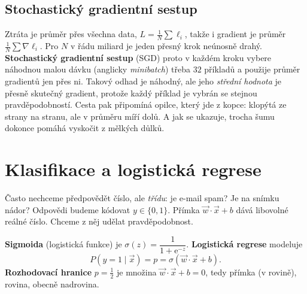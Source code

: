 \subsection{Stochastický gradientní sestup}

Ztráta je průměr přes všechna data, $L = \frac{1}{N}\sum\ell_i$, takže i gradient je průměr $\frac{1}{N}\sum\nabla\ell_i$. Pro $N$ v řádu miliard je jeden přesný krok neúnosně drahý. \textbf{Stochastický gradientní sestup} (SGD) proto v každém kroku vybere náhodnou malou dávku (anglicky \textit{minibatch}) třeba $32$ příkladů a použije průměr gradientů jen přes ni. Takový odhad je náhodný, ale jeho \textit{střední hodnota} je přesně skutečný gradient, protože každý příklad je vybrán se stejnou pravděpodobností. Cesta pak připomíná opilce, který jde z kopce: klopýtá ze strany na stranu, ale v průměru míří dolů. A jak se ukazuje, trocha šumu dokonce pomáhá vyskočit z mělkých důlků.

\section{Klasifikace a logistická regrese}

Často nechceme předpovědět číslo, ale \textit{třídu}: je e-mail spam? Je na snímku nádor? Odpovědi budeme kódovat $y\in\{0, 1\}$. Přímka $\vec{w}\cdot\vec{x} + b$ dává libovolné reálné číslo. Chceme z něj udělat pravděpodobnost.

\begin{definitionbox}
  \textbf{Sigmoida} (logistická funkce) je $\sigma(z) = \dfrac{1}{1 + \mathrm{e}^{-z}}$. \textbf{Logistická regrese} modeluje
  \begin{equation*}
    P(y = 1\mid\vec{x}) = p = \sigma(\vec{w}\cdot\vec{x} + b).
  \end{equation*}
  \textbf{Rozhodovací hranice} $p = \frac{1}{2}$ je množina $\vec{w}\cdot\vec{x} + b = 0$, tedy přímka (v rovině), rovina, obecně nadrovina.
\end{definitionbox}

